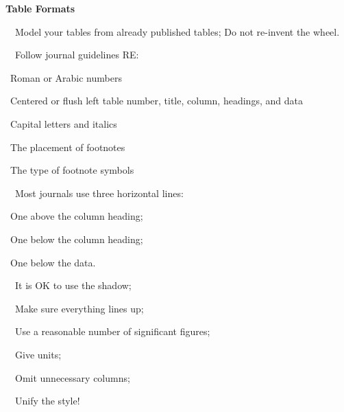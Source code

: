\documentclass[a4paper, 12pt]{article}
\begin{document}
\newpage\textbf{Table Formats}
\par\ \textbullet\ Model your tables from already published tables; Do not re-invent the wheel.
\par\ \textbullet\ Follow journal guidelines RE:
\par\quad\textopenbullet\ Roman or Arabic numbers
\par\quad\textopenbullet\ Centered or flush left table number, title, column, headings, and data
\par\quad\textopenbullet\ Capital letters and italics
\par\quad\textopenbullet\ The placement of footnotes
\par\quad\textopenbullet\ The type of footnote symbols
\par\ \textbullet\ Most journals use three horizontal lines:
\par\quad\textopenbullet\ One above the column heading;
\par\quad\textopenbullet\ One below the column heading;
\par\quad\textopenbullet\ One below the data.
\par\ \textbullet\ It is OK to use the shadow;
\par\ \textbullet\ Make sure everything lines up;
\par\ \textbullet\ Use a reasonable number of significant figures;
\par\ \textbullet\ Give units;
\par\ \textbullet\ Omit unnecessary columns;
\par\ \textbullet\ Unify the style!
\end{document}
